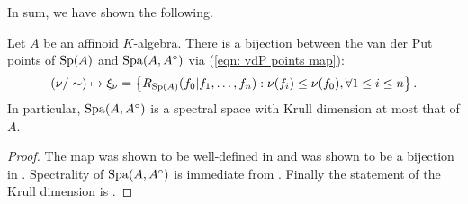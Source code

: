 In sum, we have shown the following. 
\begin{theorem}\label{thm: Huber-Schneider-vdP}
    Let $A$ be an affinoid $K$-algebra. There is a bijection between the van der Put points of $\mathrm{Sp}(A)$ and $\mathrm{Spa}(A,A^{\circ})$ via (\ref{eqn: vdP points map}):
    $$(\nu/\sim)\mapsto\xi_{\nu}=\left\{R_{\mathrm{Sp}(A)}(f_{0}|f_{1},\dots,f_{n}):\nu(f_{i})\leq\nu(f_{0}),\forall 1\leq i\leq n\right\}.$$
    In particular, $\mathrm{Spa}(A,A^{\circ})$ is a spectral space with Krull dimension at most that of $A$.
\end{theorem}
\begin{proof}
    The map was shown to be well-defined in  and was shown to be a bijection in . Spectrality of $\mathrm{Spa}(A,A^{\circ})$ is immediate from . Finally the statement of the Krull dimension is . 
\end{proof}
